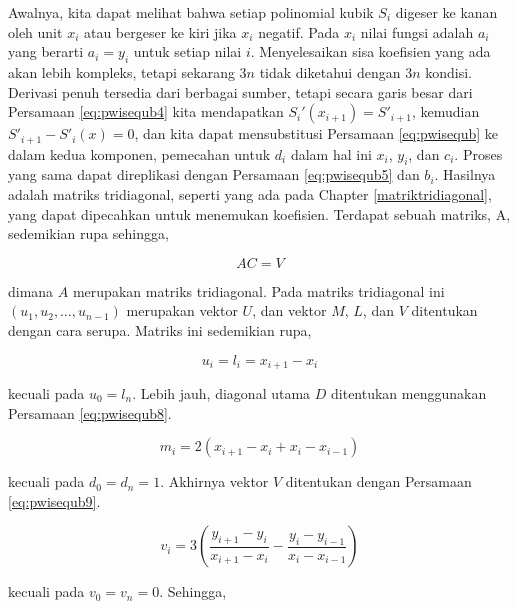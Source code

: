 \documentclass[]{book}
\theoremstyle{definition}
\theoremstyle{definition}
\theoremstyle{definition}
\theoremstyle{remark}
\begin{document}
Awalnya, kita dapat melihat bahwa setiap polinomial kubik \(S_i\) digeser ke kanan oleh unit \(x_i\) atau bergeser ke kiri jika \(x_i\) negatif. Pada \(x_i\) nilai fungsi adalah \(a_i\) yang berarti \(a_i = y_i\) untuk setiap nilai \(i\). Menyelesaikan sisa koefisien yang ada akan lebih kompleks, tetapi sekarang \(3n\) tidak diketahui dengan \(3n\) kondisi. Derivasi penuh tersedia dari berbagai sumber, tetapi secara garis besar dari Persamaan \eqref{eq:pwisequb4} kita mendapatkan \(S_i'\left(x_{i+1}\right)=S'_{i+1}\), kemudian \(S'_{i + 1} - S'_i \left(x\right) = 0\), dan kita dapat mensubstitusi Persamaan \eqref{eq:pwisequb} ke dalam kedua komponen, pemecahan untuk \(d_i\) dalam hal ini \(x_i\), \(y_i\), dan \(c_i\). Proses yang sama dapat direplikasi dengan Persamaan \eqref{eq:pwisequb5} dan \(b_i\). Hasilnya adalah matriks tridiagonal, seperti yang ada pada Chapter \ref{matriktridiagonal}, yang dapat dipecahkan untuk menemukan koefisien. Terdapat sebuah matriks, A, sedemikian rupa sehingga,

\begin{equation}
AC=V
  \label{eq:pwisequb6}
\end{equation}

dimana \(A\) merupakan matriks tridiagonal. Pada matriks tridiagonal ini \(\left(u_1,u_2,\dots,u_{n-1}\right)\) merupakan vektor \(U\), dan vektor \(M\), \(L\), dan \(V\) ditentukan dengan cara serupa. Matriks ini sedemikian rupa,

\begin{equation}
u_i=l_i=x_{i+1}-x_i
  \label{eq:pwisequb7}
\end{equation}

kecuali pada \(u_0=l_n\). Lebih jauh, diagonal utama \(D\) ditentukan menggunakan Persamaan \eqref{eq:pwisequb8}.

\begin{equation}
m_i=2\left(x_{i+1}-x_i+x_i-x_{i-1}\right)
  \label{eq:pwisequb8}
\end{equation}

kecuali pada \(d_0=d_n=1\). Akhirnya vektor \(V\) ditentukan dengan Persamaan \eqref{eq:pwisequb9}.

\begin{equation}
v_i=3\left(\frac{y_{i+1}-y_i}{x_{i+1}-x_i}-\frac{y_i-y_{i-1}}{x_i-x_{i-1}}\right)
  \label{eq:pwisequb9}
\end{equation}

kecuali pada \(v_0=v_n=0\). Sehingga,
\end{document}
